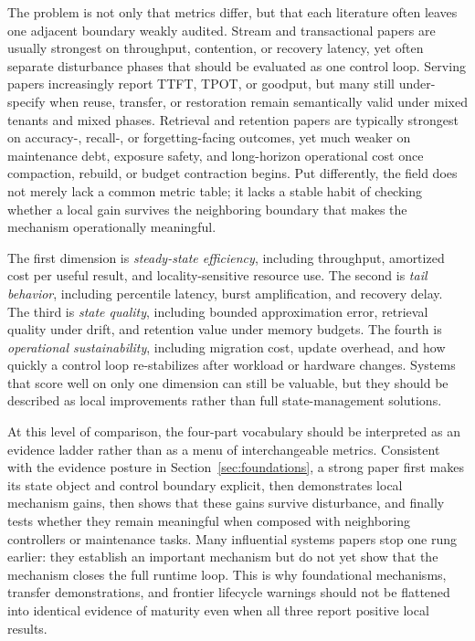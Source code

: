 \documentclass[acmsmall,screen,review]{acmart}
\begin{document}
The problem is not only that metrics differ, but that each literature often leaves one adjacent boundary weakly audited. Stream and transactional papers are usually strongest on throughput, contention, or recovery latency, yet often separate disturbance phases that should be evaluated as one control loop. Serving papers increasingly report TTFT, TPOT, or goodput, but many still under-specify when reuse, transfer, or restoration remain semantically valid under mixed tenants and mixed phases. Retrieval and retention papers are typically strongest on accuracy-, recall-, or forgetting-facing outcomes, yet much weaker on maintenance debt, exposure safety, and long-horizon operational cost once compaction, rebuild, or budget contraction begins. Put differently, the field does not merely lack a common metric table; it lacks a stable habit of checking whether a local gain survives the neighboring boundary that makes the mechanism operationally meaningful.

The first dimension is \emph{steady-state efficiency}, including throughput, amortized cost per useful result, and locality-sensitive resource use. The second is \emph{tail behavior}, including percentile latency, burst amplification, and recovery delay. The third is \emph{state quality}, including bounded approximation error, retrieval quality under drift, and retention value under memory budgets. The fourth is \emph{operational sustainability}, including migration cost, update overhead, and how quickly a control loop re-stabilizes after workload or hardware changes. Systems that score well on only one dimension can still be valuable, but they should be described as local improvements rather than full state-management solutions.

At this level of comparison, the four-part vocabulary should be interpreted as an evidence ladder rather than as a menu of interchangeable metrics. Consistent with the evidence posture in Section~\ref{sec:foundations}, a strong paper first makes its state object and control boundary explicit, then demonstrates local mechanism gains, then shows that these gains survive disturbance, and finally tests whether they remain meaningful when composed with neighboring controllers or maintenance tasks. Many influential systems papers stop one rung earlier: they establish an important mechanism but do not yet show that the mechanism closes the full runtime loop. This is why foundational mechanisms, transfer demonstrations, and frontier lifecycle warnings should not be flattened into identical evidence of maturity even when all three report positive local results.
\end{document}
